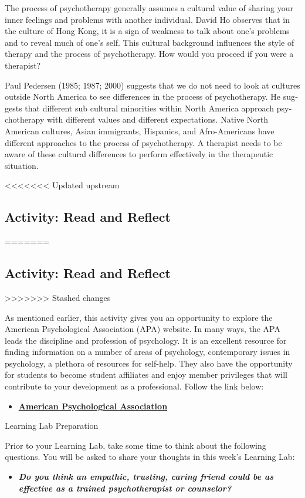 \documentclass[
]{book}
\providecommand{\tightlist}{%
  \setlength{\itemsep}{0pt}\setlength{\parskip}{0pt}}
\begin{document}
The process of psychotherapy generally assumes a cultural value of sharing your inner feelings and problems with another individual. David Ho observes that in the culture of Hong Kong, it is a sign of weakness to talk about one's problems and to reveal much of one's self. This cultural background influences the style of therapy and the process of psychotherapy. How would you proceed if you were a therapist?

Paul Pedersen (1985; 1987; 2000) suggests that we do not need to look at cultures outside North America to see differences in the process of psychotherapy. He sug­gests that different sub cultural minorities within North America approach psy­chotherapy with different values and different expectations. Native North American cultures, Asian immigrants, Hispanics, and Afro-Americans have different approaches to the pro­cess of psychotherapy. A therapist needs to be aware of these cultural differ­ences to perform effectively in the therapeutic situation.

<<<<<<< Updated upstream
\hypertarget{activity-read-and-reflect-20}{%
\subsection*{Activity: Read and Reflect}\label{activity-read-and-reflect-20}}
=======
\hypertarget{activity-read-and-reflect-19}{%
\subsection*{Activity: Read and Reflect}\label{activity-read-and-reflect-19}}
>>>>>>> Stashed changes

\begin{reflect}
As mentioned earlier, this activity gives you an opportunity to explore the American Psychological Association (APA) website. In many ways, the APA leads the discipline and profession of psychology. It is an excellent resource for finding information on a number of areas of psychology, contemporary issues in psychology, a plethora of resources for self-help. They also have the opportunity for students to become student affiliates and enjoy member privileges that will contribute to your development as a professional. Follow the link below:

\begin{itemize}
\tightlist
\item
  \href{https://www.apa.org/}{\textbf{American Psychological Association}}
\end{itemize}

{Learning Lab Preparation}

Prior to your Learning Lab, take some time to think about the following questions. You will be asked to share your thoughts in this week's Learning Lab:

\begin{itemize}
\tightlist
\item
  \textbf{\emph{Do you think an empathic, trusting, caring friend could be as effective as a trained psychotherapist or counselor?}}
\end{itemize}
\end{reflect}
\end{document}
